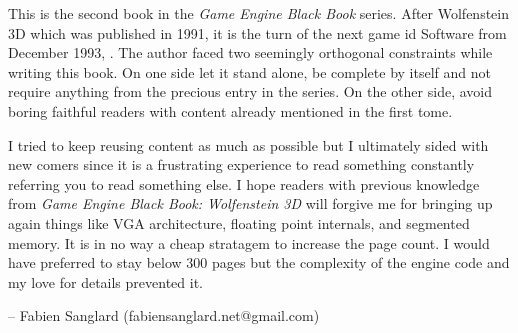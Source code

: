 This is the second book in the \textit{Game Engine Black Book} series. After Wolfenstein 3D which was published in 1991, it is the turn of the next game id Software from December 1993, \doom. The author faced two seemingly orthogonal constraints while writing this book. On one side let it stand alone, be complete by itself and not require anything from the precious entry in the series. On the other side, avoid boring faithful readers with content already mentioned in the first tome.\\
\par
I tried to keep reusing content as much as possible but I ultimately sided with new comers since it is a frustrating experience to read something constantly referring you to read something else. I hope readers with previous knowledge from \textit{Game Engine Black Book: Wolfenstein 3D} will forgive me for bringing up again things like VGA architecture, floating point internals, and segmented memory. It is in no way a cheap stratagem to increase the page count. I would have preferred to stay below 300 pages but the complexity of the engine code and my love for details prevented it.

-- Fabien Sanglard (fabiensanglard.net@gmail.com)